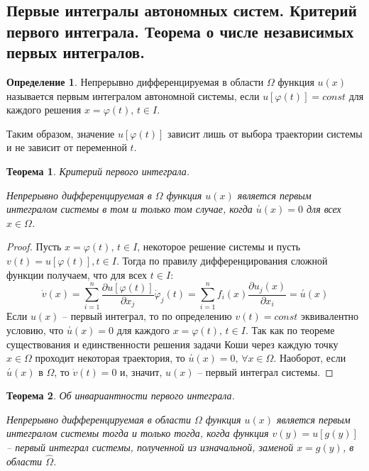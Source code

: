 \documentclass[a4paper,12pt]{article}
\renewcommand{\phi}{\ensuremath{\varphi}}
\theoremstyle{plain}
\newtheorem{theorem}{Теорема}[section]
\theoremstyle{definition}
\newtheorem{definition}{Определение}[section]
\theoremstyle{remark}
\begin{document}
\subsection{Первые интегралы автономных систем. Критерий первого интеграла. Теорема о числе независимых первых интегралов.}
\begin{definition}
	Непрерывно дифференцируемая в области $\Omega$ функция $u(x)$ называется первым интегралом автономной системы, если $u[\phi(t)] = const$ для каждого решения $x = \phi(t),\, t \in I$.

	Таким образом, значение $u[\phi(t)]$ зависит лишь от выбора траектории системы и не зависит от переменной $t$.
\end{definition}

\begin{theorem}
	Критерий первого интеграла.

	Непрерывно дифференцируемая в $\Omega$ функция $u(x)$ является первым интегралом системы в том и только том случае, когда $\overset{'}{u}(x) = 0$ для всех $x \in \Omega$.
\end{theorem}

\begin{proof}
	Пусть $x = \phi(t),\, t \in I$, некоторое решение системы и пусть $v(t) = u[\phi(t)], t \in I$. Тогда по правилу дифференцирования сложной функции получаем, что для всех $t \in I$:
	\[\dot{v}(x) = \sum_{i = 1}^n \frac{\partial u[\phi(t)]}{\partial x_j}\dot{\phi}_j(t) = \sum_{i = 1}^n f_i(x)\frac{\partial u_j(x)}{\partial x_i} = \overset{'}{u}(x)\]
	Если $u(x)$ -- первый интеграл, то по определению $v(t) = const$ эквивалентно условию, что $\overset{'}{u}(x) = 0$ для каждого $x = \phi(t),\, t \in I$. Так как по теореме существования и единственности решения задачи Коши через каждую точку $x \in \Omega$ проходит некоторая траектория, то $\overset{'}{u}(x) = 0,\, \forall x \in \Omega$. Наоборот, если $\overset{'}{u}(x)$ в $\Omega$, то $\dot{v}(t) = 0$ и, значит, $u(x)$ -- первый интеграл системы.
\end{proof}

\begin{theorem}
	Об инвариантности первого интеграла.

	Непрерывно дифференцируемая в области $\Omega$ функция $u(x)$ является первым интегралом системы тогда и только тогда, когда функция $v(y) = u[g(y)]$ -- первый интеграл системы, полученной из изначальной, заменой $x = g(y)$, в области $\hat{\Omega}$.
\end{theorem}
\end{document}
